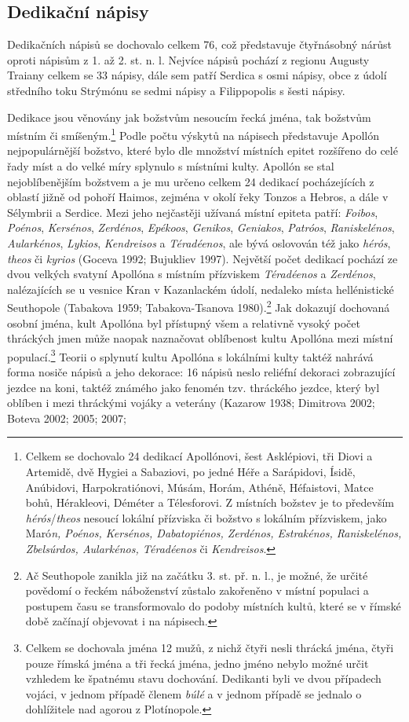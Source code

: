 \subsection[dedikační-nápisy-14]{Dedikační nápisy}

Dedikačních nápisů se dochovalo celkem 76, což představuje čtyřnásobný nárůst oproti nápisům z 1. až 2. st. n. l. Nejvíce nápisů pochází z regionu Augusty Traiany celkem se 33 nápisy, dále sem patří Serdica s osmi nápisy, obce z údolí středního toku Strýmónu se sedmi nápisy a Filippopolis s šesti nápisy.

Dedikace jsou věnovány jak božstvům nesoucím řecká jména, tak božstvům místním či smíšeným.\footnote{Celkem se dochovalo 24 dedikací Apollónovi, šest Asklépiovi, tři Diovi a Artemidě, dvě Hygiei a Sabaziovi, po jedné Héře a Sarápidovi, Ísidě, Anúbidovi, Harpokratiónovi, Músám, Horám, Athéně, Héfaistovi, Matce bohů, Hérakleovi, Déméter a Télesforovi. Z místních božstev je to především {\em hérós}/{\em theos} nesoucí lokální přízviska či božstvo s lokálním přízviskem, jako Maró{\em n, Poénos, Kersénos, Dabatopiénos, Zerdénos, Estrakénos, Raniskelénos, Zbelsúrdos, Aularkénos, Téradéenos} či {\em Kendreisos}.} Podle počtu výskytů na nápisech představuje Apollón nejpopulárnější božstvo, které bylo dle množství místních epitet rozšířeno do celé řady míst a do velké míry splynulo s místními kulty. Apollón se stal nejoblíbenějším božstvem a je mu určeno celkem 24 dedikací pocházejících z oblastí jižně od pohoří Haimos, zejména v okolí řeky Tonzos a Hebros, a dále v Sélymbrii a Serdice. Mezi jeho nejčastěji užívaná místní epiteta patří: {\em Foibos}, {\em Poénos}, {\em Kersénos}, {\em Zerdénos}, {\em Epékoos}, {\em Genikos}, {\em Geniakos}, {\em Patróos}, {\em Raniskelénos}, {\em Aularkénos}, {\em Lykios}, {\em Kendreisos} a {\em Téradéenos}, ale bývá oslovován též jako {\em hérós}, {\em theos} či {\em kyrios} (Goceva 1992; Bujukliev 1997). Největší počet dedikací pochází ze dvou velkých svatyní Apollóna s místním přízviskem {\em Téradéenos} a {\em Zerdénos}, nalézajících se u vesnice Kran v Kazanlackém údolí, nedaleko místa hellénistické Seuthopole (Tabakova 1959; Tabakova-Tsanova 1980).\footnote{Ač Seuthopole zanikla již na začátku 3. st. př. n. l., je možné, že určité povědomí o řeckém náboženství zůstalo zakořeněno v místní populaci a postupem času se transformovalo do podoby místních kultů, které se v římské době začínají objevovat i na nápisech.} Jak dokazují dochovaná osobní jména, kult Apollóna byl přístupný všem a relativně vysoký počet thráckých jmen může naopak naznačovat oblíbenost kultu Apollóna mezi místní populací.\footnote{Celkem se dochovala jména 12 mužů, z nichž čtyři nesli thrácká jména, čtyři pouze římská jména a tři řecká jména, jedno jméno nebylo možné určit vzhledem ke špatnému stavu dochování. Dedikanti byli ve dvou případech vojáci, v jednom případě členem {\em búlé} a v jednom případě se jednalo o dohlížitele nad agorou z Plotínopole.} Teorii o splynutí kultu Apollóna s lokálními kulty taktéž nahrává forma nosiče nápisů a jeho dekorace: 16 nápisů neslo reliéfní dekoraci zobrazující jezdce na koni, taktéž známého jako fenomén tzv. thráckého jezdce, který byl oblíben i mezi thráckými vojáky a veterány (Kazarow 1938; Dimitrova 2002; Boteva 2002; 2005; 2007; 